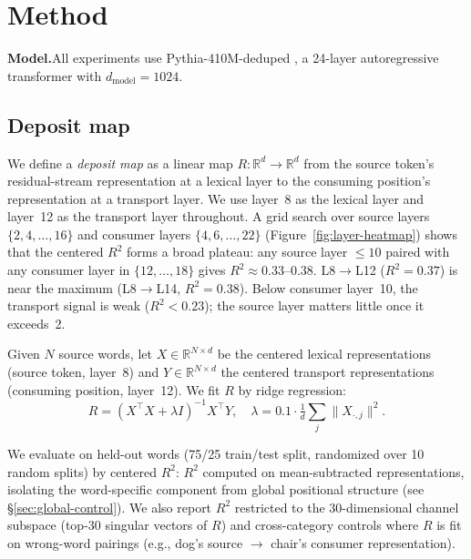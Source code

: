 \documentclass[11pt,a4paper]{article}
\begin{document}
\section{Method}
\label{sec:method}

\textbf{Model.}\quad All experiments use Pythia-410M-deduped \citep{biderman2023pythia}, a
24-layer autoregressive transformer with $d_\mathrm{model}=1024$.

\subsection{Deposit map}
\label{sec:deposit-map}

We define a \emph{deposit map} as a linear map $R: \mathbb{R}^d \to \mathbb{R}^d$ from the
source token's residual-stream representation at a lexical layer to the consuming position's
representation at a transport layer. We use layer~8 as the lexical layer and layer~12 as the
transport layer throughout. A grid search over source layers $\{2,4,\ldots,16\}$ and consumer
layers $\{4,6,\ldots,22\}$ (Figure~\ref{fig:layer-heatmap}) shows that the centered $R^2$
forms a broad plateau: any source layer $\leq 10$ paired with any consumer layer in
$\{12,\ldots,18\}$ gives $R^2 \approx 0.33\text{--}0.38$. L8$\to$L12 ($R^2 = 0.37$) is
near the maximum (L8$\to$L14, $R^2 = 0.38$). Below consumer layer~10, the transport signal
is weak ($R^2 < 0.23$); the source layer matters little once it exceeds~2.

Given $N$ source words, let $X \in \mathbb{R}^{N \times d}$ be the centered lexical
representations (source token, layer~8) and $Y \in \mathbb{R}^{N \times d}$ the centered
transport representations (consuming position, layer~12). We fit $R$ by ridge regression:
\begin{equation}
R = (X^\top X + \lambda I)^{-1} X^\top Y,
\quad \lambda = 0.1 \cdot \tfrac{1}{d}\sum_j \|X_{\cdot,j}\|^2.
\end{equation}

We evaluate on held-out words (75/25 train/test split, randomized over 10 random splits) by
centered $R^2$: $R^2$ computed on mean-subtracted representations, isolating the
word-specific component from global positional structure (see \S\ref{sec:global-control}).
We also report $R^2$ restricted to the 30-dimensional channel subspace (top-30 singular
vectors of $R$) and cross-category controls where $R$ is fit on wrong-word pairings
(e.g., dog's source $\to$ chair's consumer representation).
\end{document}
